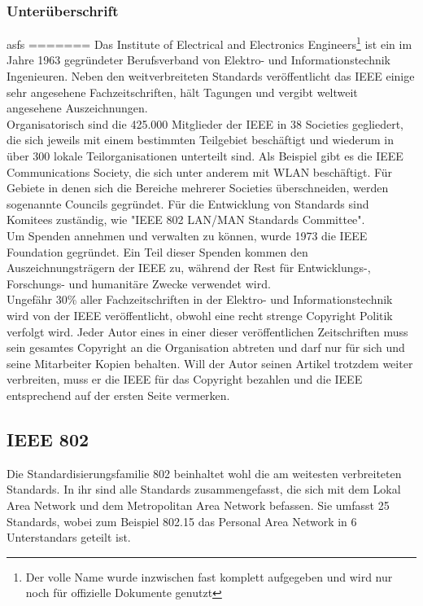 \documentclass[a4paper,13pt]{scrartcl}
\begin{document}
\subsubsection{Unterüberschrift}
asfs
=======
Das Institute of Electrical and Electronics Engineers\footnote{Der volle Name wurde inzwischen fast komplett aufgegeben und wird nur noch für offizielle Dokumente genutzt} ist ein im Jahre 1963 gegründeter Berufsverband von Elektro- und Informationstechnik Ingenieuren. Neben den weitverbreiteten Standards veröffentlicht das IEEE einige sehr angesehene Fachzeitschriften, hält Tagungen und vergibt weltweit angesehene Auszeichnungen. \\
Organisatorisch sind die 425.000 Mitglieder der IEEE in 38 Societies gegliedert, die sich jeweils mit einem bestimmten Teilgebiet beschäftigt und wiederum in über 300 lokale Teilorganisationen unterteilt sind. Als Beispiel gibt es die IEEE Communications Society, die sich unter anderem mit WLAN beschäftigt. Für Gebiete in denen sich die Bereiche mehrerer Societies überschneiden, werden sogenannte Councils gegründet. Für die Entwicklung von Standards sind Komitees zuständig, wie "IEEE 802 LAN/MAN Standards Committee".\\
Um Spenden annehmen und verwalten zu können, wurde 1973 die IEEE Foundation gegründet. Ein Teil dieser Spenden kommen den Auszeichnungsträgern der IEEE zu, während der Rest für Entwicklungs-, Forschungs- und humanitäre Zwecke verwendet wird. \\
Ungefähr 30\% aller Fachzeitschriften in der Elektro- und Informationstechnik wird von der IEEE veröffentlicht, obwohl eine recht strenge Copyright Politik verfolgt wird. Jeder Autor eines in einer dieser veröffentlichen Zeitschriften muss sein gesamtes Copyright an die Organisation abtreten und darf nur für sich und seine Mitarbeiter Kopien behalten. Will der Autor seinen Artikel trotzdem weiter verbreiten, muss er die IEEE für das Copyright bezahlen und die IEEE entsprechend auf der ersten Seite vermerken.
\subsection{IEEE 802}
Die Standardisierungsfamilie 802 beinhaltet wohl die am weitesten verbreiteten Standards. In ihr sind alle Standards zusammengefasst, die sich mit dem Lokal Area Network und dem Metropolitan Area Network befassen. Sie umfasst 25 Standards, wobei zum Beispiel 802.15 das Personal Area Network in 6 Unterstandars geteilt ist. 

\clearpage
\end{document}

